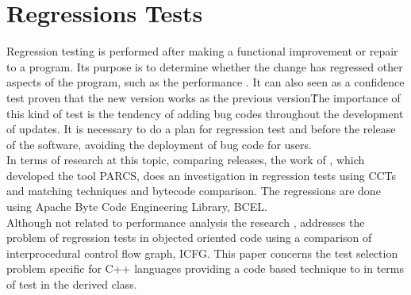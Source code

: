 \section{Regressions Tests}
Regression testing is performed after making a functional improvement or repair to a program. Its purpose is to determine whether the change has regressed other aspects of the program, such as the performance \cite{book_testing}. It can also seen as a confidence test proven that the new version works as the previous version\.
The importance of this kind of test is the tendency of adding bug codes throughout the development of updates. It is necessary to do a plan for regression test and before the release of the software, avoiding the deployment of bug code for users.\\
In terms of research at this topic, comparing releases, the work of \cite{parcs}, which developed the tool PARCS, does an investigation in regression tests using CCTs and matching techniques and bytecode comparison. The regressions are done using Apache Byte Code Engineering Library, BCEL. \\
Although not related to performance analysis the research \cite{book_testing}, addresses the problem of regression tests in objected oriented code using a comparison of interprocedural control flow graph, ICFG. This paper concerns the test selection problem specific for C++ languages providing a code based technique to in terms of test in the derived class.
